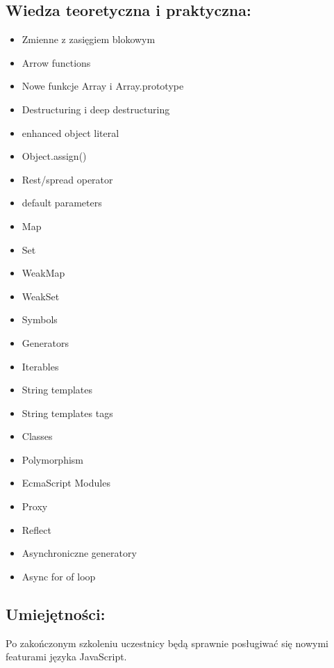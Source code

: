 \documentclass{article}[10pt]
\begin{document}
	\subsection*{Wiedza teoretyczna i praktyczna:}
\begin{adjustwidth}{1.5cm}{}
	\begin{itemize}
		\item Zmienne z zasięgiem blokowym
		\item Arrow functions
		\item Nowe funkcje Array i Array.prototype
		\item Destructuring i deep destructuring
		\item enhanced object literal
		\item Object.assign()
		\item Rest/spread operator
		\item default parameters
		\item Map
		\item Set
		\item WeakMap
		\item WeakSet
		\item Symbols
		\item Generators
		\item Iterables
		\item String templates
		\item String templates tags
		\item Classes
		\item Polymorphism
		\item EcmaScript Modules
		\item Proxy
		\item Reflect
		\item Asynchroniczne generatory
		\item Async for of loop
	\end{itemize}
\end{adjustwidth}

	\subsection*{Umiejętności:}
\begin{adjustwidth}{2cm}{}
\justifying
	
Po zakończonym szkoleniu uczestnicy będą sprawnie posługiwać się nowymi featurami języka JavaScript.
\end{adjustwidth}

\newpage
\end{document}
